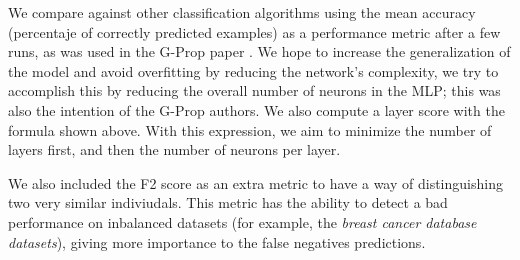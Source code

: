 \documentclass[conference]{IEEEtran}\usepackage[]{graphicx}\usepackage[]{color}
\begin{document}



We compare against other classification algorithms using the mean accuracy (percentaje
of correctly predicted examples) as a performance metric after a few runs, %
as was used in the G-Prop paper \cite{castilloNC,CastilloNPL}. We hope to
increase the generalization of the model and avoid overfitting by reducing the
network's complexity, we try to accomplish this by reducing the
overall number of neurons in the MLP; this was also the intention of the G-Prop
authors. We also compute a layer score with the formula shown above. With
this expression, we aim to minimize the number of layers first, and then the number of
neurons per layer.

We also included the F2 score as an extra metric to have a way of
distinguishing two very similar indiviudals. This metric has the ability to
detect a bad performance on inbalanced datasets (for example, the \emph{breast
cancer database datasets}), giving more importance to the false negatives
predictions.

\end{document}

